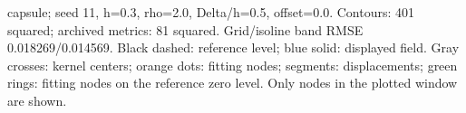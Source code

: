 capsule; seed 11, h=0.3, rho=2.0, Delta/h=0.5, offset=0.0. Contours: 401 squared; archived metrics: 81 squared. Grid/isoline band RMSE 0.018269/0.014569. Black dashed: reference level; blue solid: displayed field. Gray crosses: kernel centers; orange dots: fitting nodes; segments: displacements; green rings: fitting nodes on the reference zero level. Only nodes in the plotted window are shown.